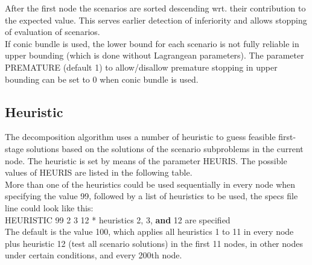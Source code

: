 \documentclass[11pt,draft]{article}
\newcommand{\+}{{\ti{+}}}
\newcommand{\1}{{\ti{1}}}
\begin{document}
After the first node the scenarios are sorted descending wrt. their contribution to the expected value. 
This serves earlier detection of inferiority and allows stopping of evaluation of scenarios.\\
If conic bundle is used, the lower bound for each scenario is not fully reliable in upper bounding (which is done without Lagrangean parameters).
The parameter PREMATURE (default 1) to allow/disallow premature stopping in upper bounding can be set to 0 when conic bundle is used.

\subsection{Heuristic}
The decomposition algorithm uses a number of heuristic to guess feasible first-stage solutions based on the
solutions of the scenario subproblems in the current node. The heuristic is set by means of the parameter
HEURIS. The possible values of HEURIS are listed in the following table.\\
More than one of the heuristics could be used sequentially in every node when specifying the value 99, followed by a
list of heuristics to be used, the specs file line could look like this:\\[0.5em]
HEURISTIC  99 2 3 12 * heuristics 2, 3, {\bf and} 12 are specified\\[0.5em]
The default is the value 100, which applies all heuristics 1 to 11 in every node plus heuristic 12 (test all scenario solutions) in the first 11 nodes,
in other nodes under certain conditions, and every 200th node.
%
\end{document}
